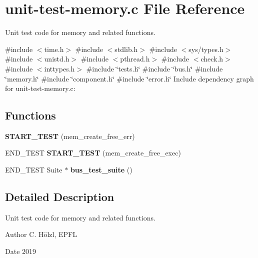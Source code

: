 \hypertarget{unit-test-memory_8c}{}\section{unit-\/test-\/memory.c File Reference}
\label{unit-test-memory_8c}


Unit test code for memory and related functions.  


{\ttfamily \#include $<$time.\+h$>$}\newline
{\ttfamily \#include $<$stdlib.\+h$>$}\newline
{\ttfamily \#include $<$sys/types.\+h$>$}\newline
{\ttfamily \#include $<$unistd.\+h$>$}\newline
{\ttfamily \#include $<$pthread.\+h$>$}\newline
{\ttfamily \#include $<$check.\+h$>$}\newline
{\ttfamily \#include $<$inttypes.\+h$>$}\newline
{\ttfamily \#include \char`\"{}tests.\+h\char`\"{}}\newline
{\ttfamily \#include \char`\"{}bus.\+h\char`\"{}}\newline
{\ttfamily \#include \char`\"{}memory.\+h\char`\"{}}\newline
{\ttfamily \#include \char`\"{}component.\+h\char`\"{}}\newline
{\ttfamily \#include \char`\"{}error.\+h\char`\"{}}\newline
Include dependency graph for unit-\/test-\/memory.c\+:
\subsection*{Functions}
\begin{DoxyCompactItemize}
\item 
\mbox{\label{unit-test-memory_8c_a3ef12dd2d4366f0d80e62669ed9f063f}} 
{\bfseries S\+T\+A\+R\+T\+\_\+\+T\+E\+ST} (mem\+\_\+create\+\_\+free\+\_\+err)
\item 
\mbox{\label{unit-test-memory_8c_a5719677cf0e584b01749bf273e553040}} 
E\+N\+D\+\_\+\+T\+E\+ST {\bfseries S\+T\+A\+R\+T\+\_\+\+T\+E\+ST} (mem\+\_\+create\+\_\+free\+\_\+exec)
\item 
\mbox{\label{unit-test-memory_8c_a9942b766a70847794d9eba89f6f01b42}} 
E\+N\+D\+\_\+\+T\+E\+ST Suite $\ast$ {\bfseries bus\+\_\+test\+\_\+suite} ()
\end{DoxyCompactItemize}


\subsection{Detailed Description}
Unit test code for memory and related functions. 

\begin{DoxyAuthor}{Author}
C. Hölzl, E\+P\+FL 
\end{DoxyAuthor}
\begin{DoxyDate}{Date}
2019 
\end{DoxyDate}
